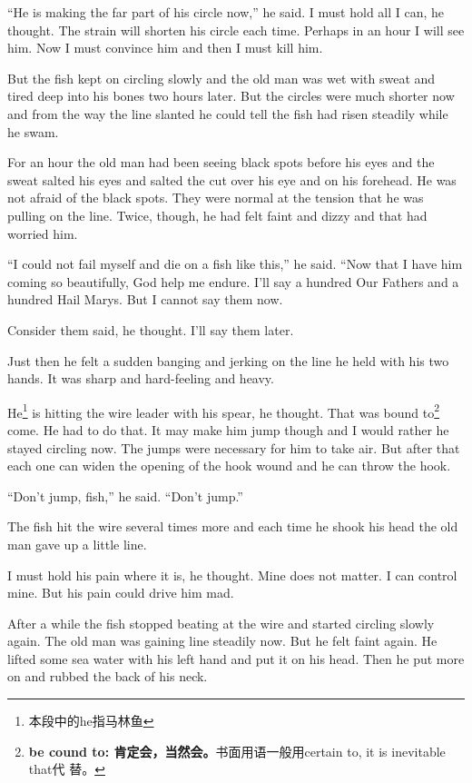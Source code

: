 ``He is making the far part of his circle now,'' he said. I must hold all I
can, he thought. The strain will shorten his circle each time. Perhaps in an
hour I will see him. Now I must convince him and then I must kill him.

But the fish kept on circling slowly and the old man was wet with sweat and
tired deep into his bones two hours later. But the circles were much shorter
now and from the way the line slanted he could tell the fish had risen
steadily while he swam.

For an hour the old man had been seeing black spots before his eyes and the
sweat salted his eyes and salted the cut over his eye and on his forehead.
He was not afraid of the black spots. They were normal at the tension that
he was pulling on the line. Twice, though, he had felt faint and \gls{dizzy}
and that had worried him.

``I could not fail myself and die on a fish like this,'' he said. ``Now that
I have him coming so beautifully, God help me endure. I'll say a hundred Our
Fathers and a hundred Hail Marys. But I cannot say them now.

Consider them said, he thought. I'll say them later.

Just then he felt a sudden banging and jerking on the line he held with his
two hands. It was sharp and \gls{hard-feeling} and heavy.

He\footnote{本段中的he指马林鱼} is hitting the wire leader with his
\gls{spear}, he thought. That was \gls{bound} to\footnote{\textbf{be cound
    to: 肯定会，当然会。}书面用语一般用certain to, it is inevitable that代
  替。} come. He had to do that. It may make him jump though and I would
rather he stayed circling now. The jumps were necessary for him to take air.
But after that each one can widen the opening of the hook \gls{wound} and he
can throw the hook.

``Don't jump, fish,'' he said. ``Don't jump.''

The fish hit the wire several times more and each time he \gls{shook} his
head the old man gave up a little line.

I must hold his pain where it is, he thought. Mine does not matter. I can
control mine. But his pain could drive him mad.

After a while the fish stopped beating at the wire and started circling
slowly again. The old man was gaining line steadily now. But he felt faint
again. He lifted some sea water with his left hand and put it on his head.
Then he put more on and rubbed the back of his neck.

